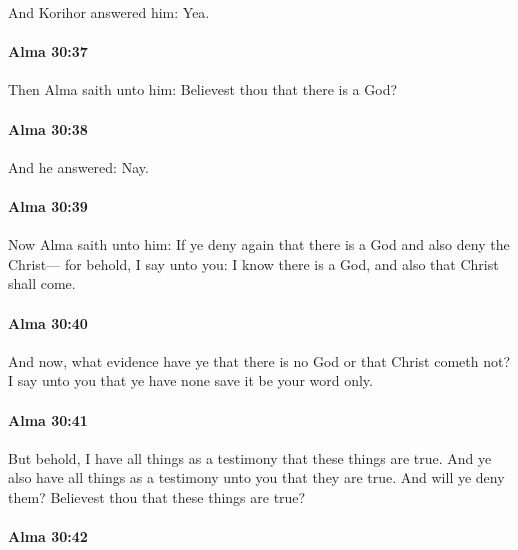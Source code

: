 			And Korihor answered him: Yea.

		\paragraph{Alma 30:37} %
			\label{ALMA-30-37}

			Then Alma saith unto him:
			Believest thou that there is a God?

		\paragraph{Alma 30:38} %
			\label{ALMA-30-38}

			And he answered: Nay.

		\paragraph{Alma 30:39} %
			\label{ALMA-30-39}

			Now Alma saith unto him:
			If ye deny again that there is a God and also deny the Christ---
			for behold, I say unto you:
			I know there is a God,
			and also that Christ shall come.

		\paragraph{Alma 30:40} %
			\label{ALMA-30-40}

			And now, what evidence have ye that there is no God or that Christ cometh not?
			I say unto you that ye have none save it be your word only.

		\paragraph{Alma 30:41} %
			\label{ALMA-30-41}

			But behold, I have all things as a testimony that these things are true.
			And ye also have all things as a testimony unto you that they are true.
			And will ye deny them?
			Believest thou that these things are true?

		\paragraph{Alma 30:42} %
			\label{ALMA-30-42}

